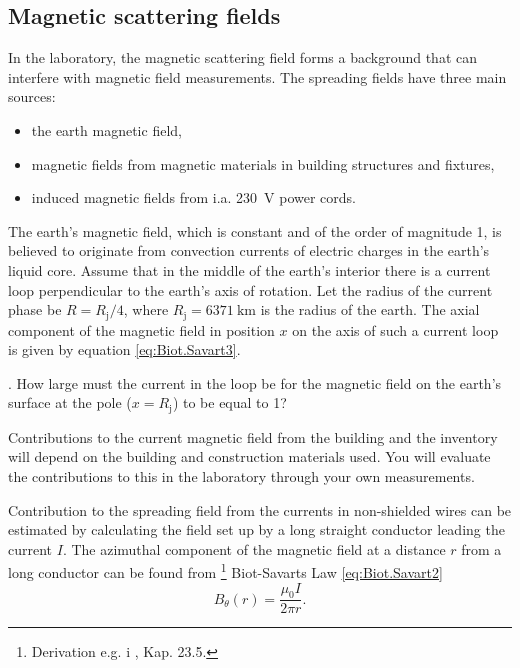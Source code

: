 \documentclass[../Elmag-labhefte-2020.tex]{subfiles}
\begin{document}
\subsection{Magnetic scattering fields}

In the laboratory, the magnetic scattering field forms a background that can interfere with magnetic field measurements. The spreading fields have three main sources:
\vspace{-4mm}
\begin{itemize}
    \item the earth magnetic field,
    \item magnetic fields from magnetic materials in building structures and fixtures,
    \item induced magnetic fields from i.a. \SI{230}{\volt} power cords.
\end{itemize}

The earth's magnetic field, which is constant and of the order of magnitude \SI{1}{\gauss}, is believed to originate from convection currents of electric charges in the earth's liquid core. Assume that in the middle of the earth's interior there is a current loop perpendicular to the earth's axis of rotation. Let the radius of the current phase be $R = R_\text{j}/4$, where $R_\text{j} = \SI{6371}{\km}$ is the radius of the earth. The axial component of the magnetic field in position $x$ on the axis of such a current loop is given by equation \eqref{eq:Biot.Savart3}.

{. How large must the current in the loop be for the magnetic field on the earth's surface at the pole ($x = R_\text{j}$) to be equal to \SI{1}{\gauss}? }


Contributions to the current magnetic field from the building and the inventory will depend on the building and construction materials used. You will evaluate the contributions to this in the laboratory through your own measurements.

Contribution to the spreading field from the currents in non-shielded wires can be estimated by calculating the field set up by a long straight conductor leading the current $I$. The azimuthal component of the magnetic field at a distance $r$ from a long conductor can be found from \footnote{Derivation e.g. i \cite{lillestol}, Kap. 23.5.} Biot-Savarts Law \eqref{eq:Biot.Savart2}
\begin{equation}
    B_\theta (r) = \frac{\mu_0 I}{2\pi r} .
\end{equation}
\end{document}
